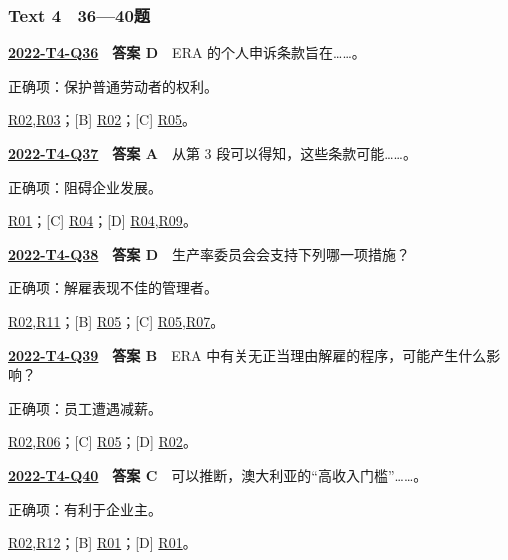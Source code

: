 \documentclass[11pt,a4paper]{article}
\begin{document}
\subsubsection{Text 4　36—40题}
\label{idx-2022-T4-Q36}
\noindent\textbf{\href{https://zj139.github.io/math-notes/english/a004b252764da10cc908bfd6/\#q36}{2022-T4-Q36}　答案 D}　ERA 的个人申诉条款旨在……。\par\nopagebreak
\noindent 正确项：保护普通劳动者的权利。\par\nopagebreak
\noindent [A] \hyperref[cat-R02]{R02},\hyperref[cat-R03]{R03}；[B] \hyperref[cat-R02]{R02}；[C] \hyperref[cat-R05]{R05}。
\par\smallskip
{}\label{idx-2022-T4-Q37}
\noindent\textbf{\href{https://zj139.github.io/math-notes/english/a004b252764da10cc908bfd6/\#q37}{2022-T4-Q37}　答案 A}　从第 3 段可以得知，这些条款可能……。\par\nopagebreak
\noindent 正确项：阻碍企业发展。\par\nopagebreak
\noindent [B] \hyperref[cat-R01]{R01}；[C] \hyperref[cat-R04]{R04}；[D] \hyperref[cat-R04]{R04},\hyperref[cat-R09]{R09}。
\par\smallskip
{}\label{idx-2022-T4-Q38}
\noindent\textbf{\href{https://zj139.github.io/math-notes/english/a004b252764da10cc908bfd6/\#q38}{2022-T4-Q38}　答案 D}　生产率委员会会支持下列哪一项措施？\par\nopagebreak
\noindent 正确项：解雇表现不佳的管理者。\par\nopagebreak
\noindent [A] \hyperref[cat-R02]{R02},\hyperref[cat-R11]{R11}；[B] \hyperref[cat-R05]{R05}；[C] \hyperref[cat-R05]{R05},\hyperref[cat-R07]{R07}。
\par\smallskip
{}\label{idx-2022-T4-Q39}
\noindent\textbf{\href{https://zj139.github.io/math-notes/english/a004b252764da10cc908bfd6/\#q39}{2022-T4-Q39}　答案 B}　ERA 中有关无正当理由解雇的程序，可能产生什么影响？\par\nopagebreak
\noindent 正确项：员工遭遇减薪。\par\nopagebreak
\noindent [A] \hyperref[cat-R02]{R02},\hyperref[cat-R06]{R06}；[C] \hyperref[cat-R05]{R05}；[D] \hyperref[cat-R02]{R02}。
\par\smallskip
{}\label{idx-2022-T4-Q40}
\noindent\textbf{\href{https://zj139.github.io/math-notes/english/a004b252764da10cc908bfd6/\#q40}{2022-T4-Q40}　答案 C}　可以推断，澳大利亚的“高收入门槛”……。\par\nopagebreak
\noindent 正确项：有利于企业主。\par\nopagebreak
\noindent [A] \hyperref[cat-R02]{R02},\hyperref[cat-R12]{R12}；[B] \hyperref[cat-R01]{R01}；[D] \hyperref[cat-R01]{R01}。
\par\smallskip
\clearpage\setlength{\parskip}{1pt}
\end{document}
